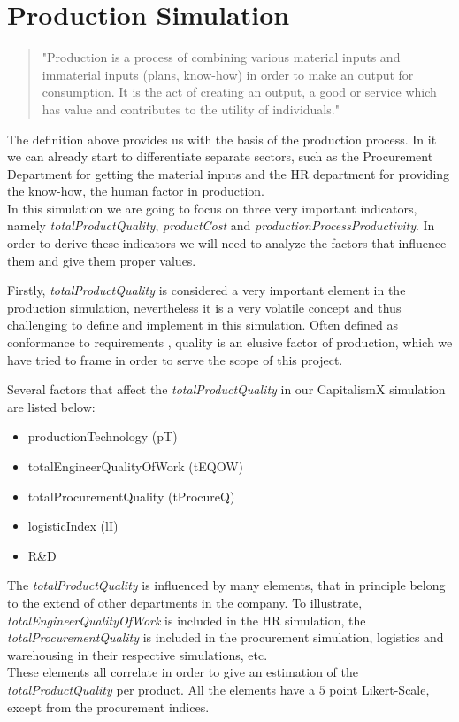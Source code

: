 \section{Production Simulation}
\label{sec:productionSim}
 \begin{quotation}
"Production is a process of combining various material inputs and immaterial inputs (plans, know-how) in order to make an output for consumption. It is the act of creating an output, a good or service which has value and contributes to the utility of individuals."\cite{noauthor_production_2019}
 \end{quotation}
The definition above provides us with the basis of the production process. In it we can already start to differentiate separate sectors, such as the Procurement Department for getting the material inputs and the HR department for providing the know-how, the human factor in production. \\
In this simulation we are going to focus on three very important indicators, namely \textit{totalProductQuality}, 
\textit{productCost} %
and \textit{productionProcessProductivity}. In order to derive these indicators we will need to analyze the factors that influence them and give them proper values. 

Firstly, \textit{totalProductQuality} is considered a very important element in the production simulation, nevertheless it is a very volatile concept and thus challenging to define and implement in this simulation. Often defined as conformance to requirements \cite{crosby_quality_1979}, quality is an elusive factor of production, which we have tried to frame in order to serve the scope of this project.

 Several factors that affect the \textit{totalProductQuality} in our CapitalismX simulation are listed below:
\begin{itemize}
\item productionTechnology (pT)
\item totalEngineerQualityOfWork (tEQOW) 
\item totalProcurementQuality (tProcureQ)
\item logisticIndex (lI) 
\item R\&D
\end{itemize}
The \textit{totalProductQuality} is influenced by many elements, that in principle belong to the extend of other departments in the company. To illustrate, \textit{totalEngineerQualityOfWork} is included in the HR simulation, the \textit{totalProcurementQuality} is included in the procurement simulation, logistics and warehousing in their respective simulations, etc. \\
These elements all correlate in order to give an estimation of the \textit{totalProductQuality} per product.
All the elements have a $5$ point Likert-Scale, except from the procurement indices. 

